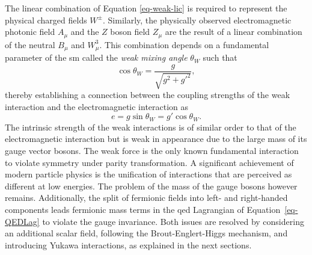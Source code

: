 The linear combination of Equation \ref{eq-weak-lic} is required to represent the physical charged fields $W^{\pm}$. Similarly, the physically observed electromagnetic photonic field $A_{\mu}$ and the $Z$ boson field $Z_{\mu}$ are the result of a linear combination of the neutral $B_{\mu}$ and $W_{\mu}^3$. This combination depends on a fundamental parameter of the \gls{sm} called the \textit{weak mixing angle} $\theta_W$ such that
\begin{equation}\label{eq-weakmixangle}
    \cos\theta_W = \frac{g}{\sqrt{g^2 +g'^2}},
\end{equation}
thereby establishing a connection between the coupling strengths of the weak interaction and the electromagnetic interaction as \[e = g \sin \theta_W = g' \cos\theta_W.\] The intrinsic strength of the weak interactions is of similar order to that of the electromagnetic interaction but is weak in appearance due to the large mass of its gauge vector bosons. The weak force is the only known fundamental interaction to violate symmetry under parity transformation. A significant achievement of modern particle physics is the unification of interactions that are perceived as different at low energies. The problem of the mass of the gauge bosons however remains. Additionally, the split of fermionic fields into left- and right-handed components leads fermionic mass terms in the \gls{qed} Lagrangian of Equation~\ref{eq-QEDLag} to violate the gauge invariance. Both issues are resolved by considering an additional scalar field, following the Brout-Englert-Higgs mechanism, and introducing Yukawa interactions, as explained in the next sections.

